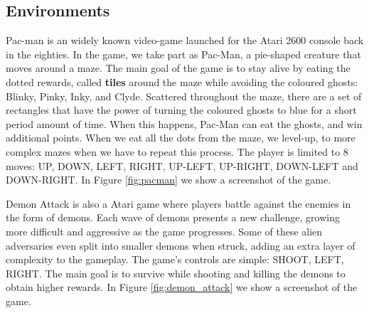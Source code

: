 \subsection{Environments}

Pac-man is an widely known video-game launched for the Atari 2600 console back in the eighties. In the game, we take part as Pac-Man, a pie-shaped creature that moves around a maze. The main goal of the game is to stay alive by eating the dotted rewards, called \textbf{tiles} around the maze while avoiding the coloured ghosts:  Blinky, Pinky, Inky, and Clyde. Scattered throughout the maze, there are a set of rectangles that have the power of turning the coloured ghosts to blue for a short period amount of time. When this happens, Pac-Man can eat the ghosts, and win additional points. When we eat all the dots from the maze, we level-up, to more complex mazes when we have to repeat this process. The player is limited to 8 moves: UP, DOWN, LEFT, RIGHT, UP-LEFT, UP-RIGHT, DOWN-LEFT and DOWN-RIGHT. In Figure \ref{fig:pacman} we show a screenshot of the game.

Demon Attack is also a Atari game where players battle against the enemies in the form of demons. Each wave of demons presents a new challenge, growing more difficult and aggressive as the game progresses. Some of these alien adversaries even split into smaller demons when struck, adding an extra layer of complexity to the gameplay. The game’s controls are simple: SHOOT, LEFT, RIGHT. The main goal is to survive while shooting and killing the demons to obtain higher rewards. In Figure \ref{fig:demon_attack} we show a screenshot of the game.


